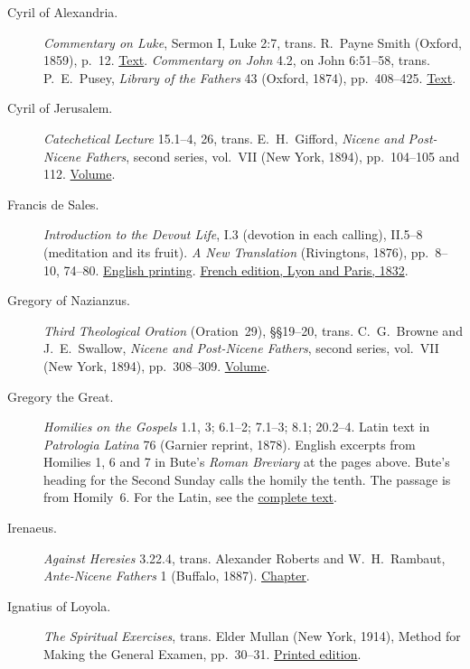 \begin{description}
\item[Cyril of Alexandria.] \textit{Commentary on Luke}, Sermon I,
  Luke 2:7, trans. R.~Payne Smith (Oxford, 1859), p.~12.
  \href{https://www.tertullian.org/fathers/cyril_on_luke_01_sermons_01_11.htm}{Text}.
  \textit{Commentary on John} 4.2, on John 6:51--58, trans. P.~E.~Pusey,
  \textit{Library of the Fathers} 43 (Oxford, 1874), pp.~408--425.
  \href{https://www.tertullian.org/fathers/cyril_on_john_04_book4.htm\#C2}{Text}.

\item[Cyril of Jerusalem.] \textit{Catechetical Lecture} 15.1--4, 26,
  trans. E.~H.~Gifford, \textit{Nicene and Post-Nicene Fathers},
  second series, vol.~VII (New York, 1894), pp.~104--105 and 112.
  \href{https://www.ccel.org/ccel/schaff/npnf207.html}{Volume}.

\item[Francis de Sales.] \textit{Introduction to the Devout Life}, I.3
  (devotion in each calling), II.5--8 (meditation and its fruit).
  \textit{A New Translation} (Rivingtons, 1876), pp.~8--10, 74--80.
  \href{https://archive.org/details/introductiontod00salegoog}{English printing}.
  \href{https://www.gutenberg.org/ebooks/53540}{French edition, Lyon and Paris, 1832}.

\item[Gregory of Nazianzus.] \textit{Third Theological Oration}
  (Oration~29), \S\S19--20, trans. C.~G.~Browne and J.~E.~Swallow,
  \textit{Nicene and Post-Nicene Fathers}, second series, vol.~VII
  (New York, 1894), pp.~308--309.
  \href{https://www.ccel.org/ccel/schaff/npnf207.html}{Volume}.

\item[Gregory the Great.] \textit{Homilies on the Gospels} 1.1, 3;
  6.1--2; 7.1--3; 8.1; 20.2--4. Latin text in \textit{Patrologia
  Latina} 76 (Garnier reprint, 1878). English excerpts from Homilies
  1, 6 and 7 in Bute's \textit{Roman Breviary} at the pages above.
  Bute's heading for the Second Sunday calls the homily the tenth.
  The passage is from Homily~6. For the Latin, see the
  \href{https://la.wikisource.org/wiki/Homiliarum_in_Evangelia}{complete text}.

\item[Irenaeus.] \textit{Against Heresies} 3.22.4, trans.
  Alexander Roberts and W.~H.~Rambaut, \textit{Ante-Nicene Fathers} 1
  (Buffalo, 1887). \href{https://www.newadvent.org/fathers/0103322.htm}{Chapter}.

\item[Ignatius of Loyola.] \textit{The Spiritual Exercises}, trans.
  Elder Mullan (New York, 1914), Method for Making the General Examen,
  pp.~30--31. \href{https://archive.org/details/TheSpiritualExercisesOfStIgnatius}{Printed edition}.


\end{description}
